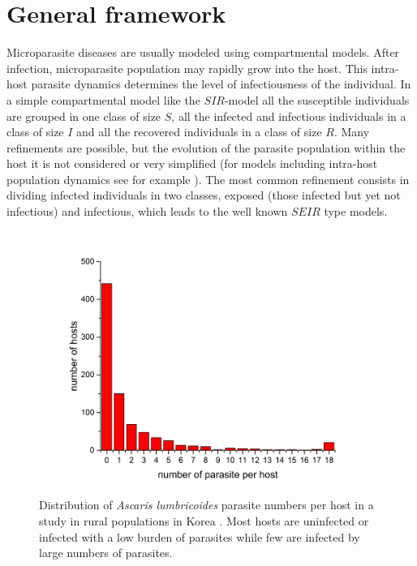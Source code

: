 \documentclass[eng]{MMSB-class-eng}
\begin{document}
%	
%	
%	
%	

\section{General framework}

Microparasite diseases are usually modeled using compartmental models. After infection,  microparasite population may rapidly grow into the host. This intra-host parasite dynamics determines the level of infectiousness of the individual. In a simple compartmental  model like the $SIR$-model  all the susceptible individuals are grouped in one class of size $S$, all the infected and infectious individuals in a class of size $I$ and all the recovered individuals in a class of size $R$. Many refinements are possible, but the evolution of the parasite population within the host it is not considered or very simplified (for models including intra-host population dynamics 
see for example \citet{gandolfi2015epidemic}).
The most common refinement consists in dividing infected individuals in two classes, exposed (those infected but yet not infectious) and infectious, which leads to the well known $SEIR$ type models. 

\begin{figure}[!tb]
	\centering
	\includegraphics[width=0.99\linewidth]{dataseo}
	\caption{Distribution of \textit{Ascaris lumbricoides} parasite numbers per host in a study in rural populations in Korea \citep{seo1979frequency}. Most hosts are uninfected or infected with a low burden of parasites while few are infected by large numbers of parasites.}
	\label{fig:dataseo}
\end{figure}
\end{document}
